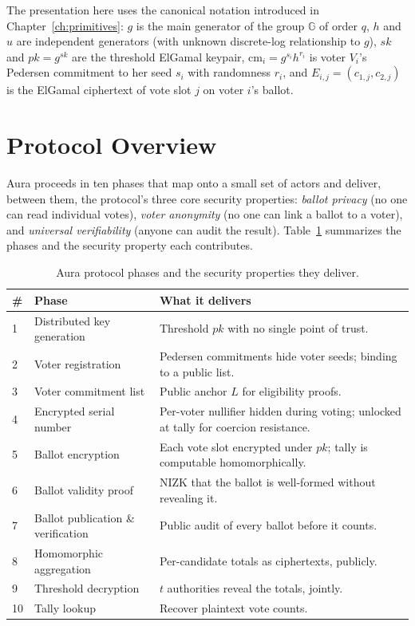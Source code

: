 \documentclass[12pt,a4paper,oneside]{report}
\begin{document}
The presentation here uses the canonical notation introduced in 
Chapter~\ref{ch:primitives}: $g$ is the main generator of the group 
$\mathbb{G}$ of order $q$, $h$ and $u$ are independent generators (with 
unknown discrete-log relationship to $g$), $sk$ and $pk = g^{sk}$ are 
the threshold ElGamal keypair, $\text{cm}_i = g^{s_i} h^{r_i}$ is voter 
$V_i$'s Pedersen commitment to her seed $s_i$ with randomness $r_i$, 
and $E_{i,j} = (c_{1,j}, c_{2,j})$ is the ElGamal ciphertext of vote 
slot $j$ on voter $i$'s ballot.

\section{Protocol Overview}
\label{sec:aura-overview}

Aura proceeds in ten phases that map onto a small set of actors and 
deliver, between them, the protocol's three core security properties: 
\textit{ballot privacy} (no one can read individual votes), \textit{voter 
anonymity} (no one can link a ballot to a voter), and \textit{universal 
verifiability} (anyone can audit the result). Table~\ref{tab:aura-phases} 
summarizes the phases and the security property each contributes.

\begin{table}[H]
\centering
\caption{Aura protocol phases and the security properties they deliver.}
\label{tab:aura-phases}
\small
\begin{tabular}{p{0.5cm}p{4.5cm}p{8.5cm}}
\toprule
\# & Phase & What it delivers \\
\midrule
1 & Distributed key generation & Threshold $pk$ with no single point of trust. \\
2 & Voter registration & Pedersen commitments hide voter seeds; binding to a public list. \\
3 & Voter commitment list & Public anchor $L$ for eligibility proofs. \\
4 & Encrypted serial number & Per-voter nullifier hidden during voting; unlocked at tally for coercion resistance. \\
5 & Ballot encryption & Each vote slot encrypted under $pk$; tally is computable homomorphically. \\
6 & Ballot validity proof & NIZK that the ballot is well-formed without revealing it. \\
7 & Ballot publication \& verification & Public audit of every ballot before it counts. \\
8 & Homomorphic aggregation & Per-candidate totals as ciphertexts, publicly. \\
9 & Threshold decryption & $t$ authorities reveal the totals, jointly. \\
10 & Tally lookup & Recover plaintext vote counts. \\
\bottomrule
\end{tabular}
\end{table}
\end{document}
